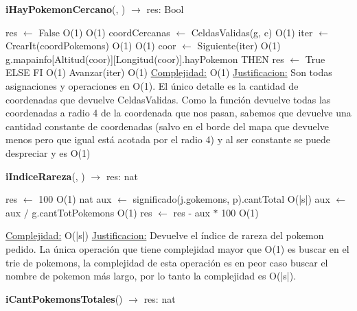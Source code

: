 \begin{Algoritmos}
\begin{algorithm}[H]{\textbf{iHayPokemonCercano}(, ) $\to$ res: Bool}
	\begin{algorithmic}[1]
		\State res $\gets$ False \Comment O(1)
		 \Comment O(1)
			\State coordCercanas $\gets$ CeldasValidas(g, c) \Comment O(1)
			\State iter $\gets$ CrearIt(coordPokemons) \Comment O(1)
			 \Comment O(1)
				\State coor $\gets$ Siguiente(iter) \Comment O(1)
				\State \IF g.mapainfo[Altitud(coor)][Longitud(coor)].hayPokemon THEN res $\gets$ True ELSE FI \Comment O(1)
				\State Avanzar(iter) \Comment O(1)
			\EndWhile
		\EndIf
		\medskip
		\Statex \underline{Complejidad:} O(1)
		\Statex \underline{Justificacion:} Son todas asignaciones y operaciones en O(1). El \'unico detalle es la cantidad de coordenadas que devuelve CeldasValidas. Como la funci\'on devuelve todas las coordenadas a radio 4 de la coordenada que nos pasan, sabemos que devuelve una cantidad constante de coordenadas (salvo en el borde del mapa que devuelve menos pero que igual est\'a acotada por el radio 4) y al ser constante se puede despreciar y es O(1)
	\end{algorithmic}
\end{algorithm}

\begin{algorithm}[H]{\textbf{iIndiceRareza}(, ) $\to$ res: nat}
	\begin{algorithmic}[1]
		
		\State res $\gets$ 100 \Comment O(1)
		\State nat aux $\gets$ significado(j.gokemons, p).cantTotal \Comment O(|s|)
		\State aux $\gets$ aux $/$ g.cantTotPokemons	\Comment O(1)
		\State res $\gets$ res - aux $*$ 100		\Comment O(1)
		
		\medskip
		\Statex \underline{Complejidad:} O(|s|)
		\Statex \underline{Justificacion:} Devuelve el índice de rareza del pokemon pedido. La única operación que tiene complejidad mayor que O(1) es buscar en el trie de pokemons, la complejidad de esta operación es en peor caso buscar el nombre de pokemon más largo, por lo tanto la complejidad es O(|s|).
	\end{algorithmic}
\end{algorithm}

\begin{algorithm}[H]{\textbf{iCantPokemonsTotales}() $\to$ res: nat}
	\begin{algorithmic}[1]
		

\end{algorithmic}
\end{algorithm}
\end{Algoritmos}
